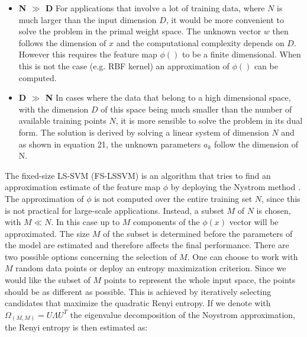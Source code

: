 \documentclass[conference,compsoc]{IEEEtran}
\begin{document}
\begin{itemize}

\item \textbf{N $\gg$ D} For applications that involve a lot of training data, where $N$ is much larger than the input dimension $D$, it would be more convenient to solve the problem in the primal weight space. The unknown vector $w$ then follows the dimension of $x$ and the computational complexity depends on $D$. However this requires the feature map $\phi()$ to be a finite dimensional. When this is not the case (e.g. RBF kernel) an approximation of $\phi()$ can be computed.
\item \textbf{D $\gg$ N} In cases where the data that belong to a high dimensional space, with the dimension $D$ of this space being much smaller than the number of available training points $N$, it is more sensible to solve the problem in its dual form. The solution is derived by solving a linear system of dimension $N$ and as shown in equation 21, the unknown parameters $a_k$ follow the dimension of N.
\end{itemize}
The fixed-size LS-SVM (FS-LSSVM) is an algorithm that tries to find an approximation estimate of the feature map $\phi$ by deploying the Nystrom method \cite{nystrom}. The approximation of $\phi$ is not computed over the entire training set $N$, since this is not practical for large-scale applications. Instead, a subset $M$ of $N$ is chosen, with $M \ll N$. In this case up to $M$ components of the $\phi(x)$ vector will be approximated. The size $M$ of the subset is determined before the parameters of the model are estimated and therefore affects the final performance. There are two possible options concerning the selection of $M$. One can choose to work with $M$ random data points or deploy an entropy maximization criterion. Since we would like the subset of $M$ points to represent the whole input space, the points should be as different as possible. This is achieved by iteratively selecting candidates that maximize the quadratic Renyi entropy. If we denote with $\Omega_(M,M)= U \Lambda U^T$ the eigenvalue decomposition of the Noystrom approximation, the Renyi entropy is then estimated as:
\end{document}

